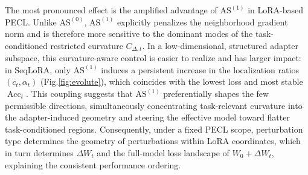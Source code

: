 \documentclass[10pt]{article} %
\begin{document}


The most pronounced effect is the amplified advantage of $\mathrm{AS}^{(1)}$ in LoRA-based PECL. Unlike $\mathrm{AS}^{(0)}$, $\mathrm{AS}^{(1)}$ explicitly penalizes the neighborhood gradient norm and is therefore more sensitive to the dominant modes of the task-conditioned restricted curvature $C_{\Delta,t}$. In a low-dimensional, structured adapter subspace, this curvature-aware control is easier to realize and has larger impact: in SeqLoRA, only $\mathrm{AS}^{(1)}$ induces a persistent increase in the localization ratios $(c_t,\alpha_t)$ (Fig.\ref{fig:evolute}), which coincides with the lowest loss and most stable $\operatorname{Acc}_t$. This coupling suggests that $\mathrm{AS}^{(1)}$ preferentially shapes the few permissible directions, simultaneously concentrating task-relevant curvature into the adapter-induced geometry and steering the effective model toward flatter task-conditioned regions. Consequently, under a fixed PECL scope, perturbation type determines the geometry of perturbations within LoRA coordinates, which in turn determines $\Delta W_t$ and the full-model loss landscape of $W_0+\Delta W_t$, explaining the consistent performance ordering.
\end{document}
